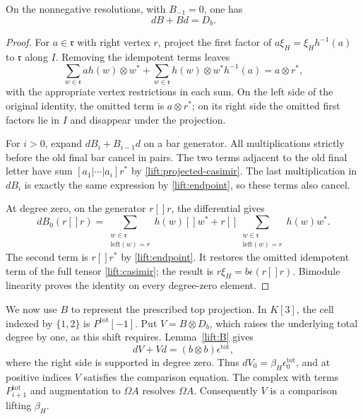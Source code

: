 \begin{lemma}
\label{lift:B}
On the nonnegative resolutions, with $B_{-1}=0$, one has
\[
 dB+Bd=D_b.
\]
\end{lemma}
\begin{proof}
For $a\in\mathfrak r$ with right vertex $r$, project the first factor of
$a\xi_H=\xi_Hh^{-1}(a)$ to $\mathfrak r$ along $I$.  Removing the idempotent
terms leaves
\begin{equation}
 \sum_{w\in\mathfrak r}ah(w)\otimes w^*
 +\sum_{w\in\mathfrak r}h(w)\otimes w^*h^{-1}(a)
 =a\otimes r^*,
 \label{lift:projected-casimir}
\end{equation}
with the appropriate vertex restrictions in each sum.
On the left side of the original identity, the omitted term is
$a\otimes r^*$; on its right side the omitted first factors lie in $I$
and disappear under the projection.

For $i>0$, expand $dB_i+B_{i-1}d$ on a bar generator.
All multiplications strictly before the old final bar cancel in pairs.
The two terms adjacent to the old final letter have sum
$[a_1|\cdots|a_i]r^*$ by
\eqref{lift:projected-casimir}.  The last multiplication in $dB_i$ is
exactly the same expression by \eqref{lift:endpoint}, so these terms
also cancel.

At degree zero, on the generator $r[]r$, the differential gives
\[
 dB_0(r[]r)=
 \sum_{\substack{w\in\mathfrak r\\\mathrm{left}(w)=r}}h(w)[]w^*
 +r[]\sum_{\substack{w\in\mathfrak r\\\mathrm{left}(w)=r}}h(w)w^*.
\]
The second term is $r[]r^*$ by \eqref{lift:endpoint}.  It restores the
omitted idempotent term of the full tensor \eqref{lift:casimir}; the
result is $r\xi_H=b\epsilon(r[]r)$.  Bimodule linearity proves the
identity on every degree-zero element.
\end{proof}

We now use $B$ to represent the prescribed top projection.
In $K[3]$, the cell indexed by $\{1,2\}$ is
$P^{\mathrm{tot}}[-1]$.  Put $V=B\otimes D_b$, which raises the
underlying total degree by one, as this shift requires.  Lemma~\ref{lift:B}
gives
\[
 dV+Vd=(b\otimes b)\epsilon^{\mathrm{tot}},
\]
where the right side is supported in degree zero.
Thus $dV_0=\beta_H\epsilon^{\mathrm{tot}}_0$, and at positive indices
$V$ satisfies the comparison equation.  The complex with terms
$P^{\mathrm{tot}}_{i+1}$ and augmentation to $\Omega A$ resolves
$\Omega A$.  Consequently $V$ is a comparison lifting $\beta_H$.

